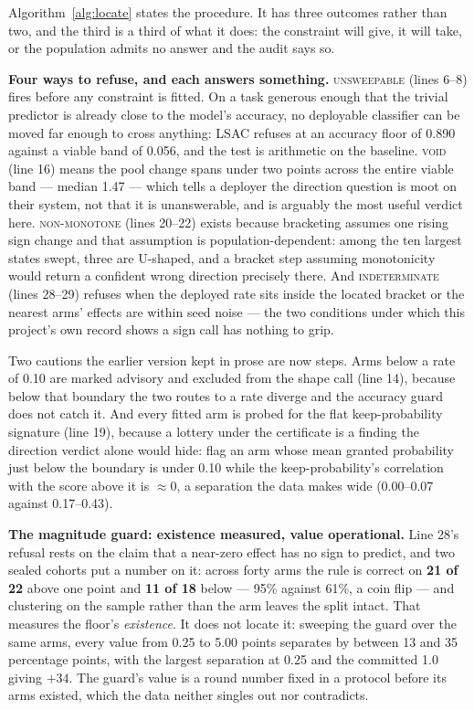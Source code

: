 \documentclass[conference]{IEEEtran}
\begin{document}
Algorithm~\ref{alg:locate} states the procedure. It has three outcomes rather than two, and
the third is a third of what it does: the constraint will give, it will take, or the
population admits no answer and the audit says so.

\textbf{Four ways to refuse, and each answers something.} \textsc{unsweepable} (lines 6--8)
fires before any constraint is fitted. On a task generous enough that the trivial predictor is
already close to the model's accuracy, no deployable classifier can be moved far enough to
cross anything: LSAC refuses at an accuracy floor of 0.890 against a viable band of 0.056, and
the test is arithmetic on the baseline. \textsc{void} (line 16) means the pool change spans
under two points across the entire viable band --- median 1.47 --- which tells a deployer the
direction question is moot on their system, not that it is unanswerable, and is arguably the
most useful verdict here. \textsc{non-monotone} (lines 20--22) exists because bracketing
assumes one rising sign change and that assumption is population-dependent: among the ten
largest states swept, three are U-shaped, and a bracket step assuming monotonicity would
return a confident wrong direction precisely there. And \textsc{indeterminate} (lines 28--29)
refuses when the deployed rate sits inside the located bracket or the nearest arms' effects
are within seed noise --- the two conditions under which this project's own record shows a
sign call has nothing to grip.

Two cautions the earlier version kept in prose are now steps. Arms below a rate of 0.10 are
marked advisory and excluded from the shape call (line 14), because below that boundary the
two routes to a rate diverge and the accuracy guard does not catch it. And every fitted arm is
probed for the flat keep-probability signature (line 19), because a lottery under the
certificate is a finding the direction verdict alone would hide: flag an arm whose mean
granted probability just below the boundary is under 0.10 while the keep-probability's
correlation with the score above it is $\approx 0$, a separation the data makes wide
(0.00--0.07 against 0.17--0.43).

\textbf{The magnitude guard: existence measured, value operational.} Line 28's refusal rests
on the claim that a near-zero effect has no sign to predict, and two sealed cohorts put a
number on it: across forty arms the rule is correct on \textbf{21 of 22} above one point and
\textbf{11 of 18} below --- 95\% against 61\%, a coin flip --- and clustering on the sample
rather than the arm leaves the split intact. That measures the floor's \emph{existence}.
It does not locate it: sweeping the guard over the same arms, every value from 0.25 to 5.00
points separates by between 13 and 35 percentage points, with the largest separation at 0.25
and the committed 1.0 giving $+34$. The guard's value is a round number fixed in a protocol
before its arms existed, which the data neither singles out nor contradicts.
\end{document}

